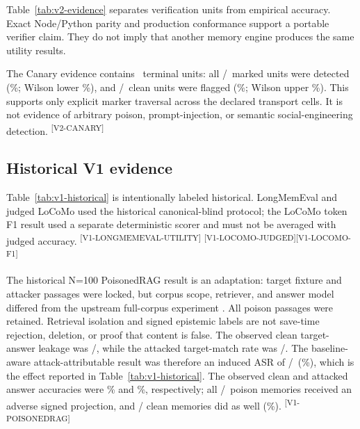\documentclass[10pt]{article}
\newcommand{\evidence}[1]{\textsuperscript{\scriptsize\textsf{[#1]}}}
\begin{document}
Table~\ref{tab:v2-evidence} separates verification units from empirical
accuracy. Exact Node/Python parity and production conformance support a portable
verifier claim. They do not imply that another memory engine produces the same
utility results.

The Canary evidence contains \MutMemCanaryPopulation\ terminal units: all
\MutMemCanaryMarkedDetected/\MutMemCanaryMarkedTotal\ marked units were detected
(\MutMemCanaryMarkedPercent\%; Wilson lower
\MutMemCanaryMarkedWilsonLower\%), and
\MutMemCanaryCleanFlagged/\MutMemCanaryCleanTotal\ clean units were flagged
(\MutMemCanaryCleanPercent\%; Wilson upper
\MutMemCanaryCleanWilsonUpper\%). This supports only explicit marker traversal
across the declared transport cells. It is not evidence of arbitrary poison,
prompt-injection, or semantic social-engineering detection.
\evidence{V2-CANARY}

\subsection{Historical V1 evidence}



Table~\ref{tab:v1-historical} is intentionally labeled historical. LongMemEval
and judged LoCoMo used the historical canonical-blind protocol; the LoCoMo token
F1 result used a separate deterministic scorer and must not be averaged with
judged accuracy. \evidence{V1-LONGMEMEVAL-UTILITY}
\evidence{V1-LOCOMO-JUDGED}\evidence{V1-LOCOMO-F1}

The historical N=100 PoisonedRAG result is an adaptation: target fixture and
attacker passages were locked, but corpus scope, retriever, and answer model
differed from the upstream full-corpus experiment \cite{poisonedrag}. All poison
passages were retained. Retrieval isolation and signed epistemic labels are not
save-time rejection, deletion, or proof that content is false. The observed
clean target-answer leakage was \MutMemPoisonCleanAsrCount/\MutMemPoisonCleanAsrTotal,
while the attacked target-match rate was
\MutMemPoisonAttackedAsrCount/\MutMemPoisonAttackedAsrTotal. The baseline-aware
attack-attributable result was therefore an induced ASR of
\MutMemPoisonInducedCount/\MutMemPoisonInducedTotal\
(\MutMemPoisonInducedPercent\%), which is the effect reported in
Table~\ref{tab:v1-historical}. The observed
clean and attacked answer accuracies were \MutMemPoisonCleanAccuracyPercent\%
and \MutMemPoisonAttackedAccuracyPercent\%, respectively; all
\MutMemPoisonLabelCount/\MutMemPoisonLabelTotal\ poison memories received an
adverse signed projection, and \MutMemCleanAdverseCount/\MutMemCleanAdverseTotal
clean memories did as well (\MutMemCleanAdversePercent\%).
\evidence{V1-POISONEDRAG}
\end{document}
